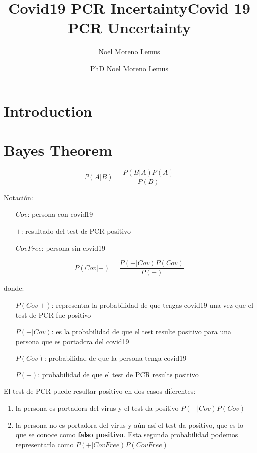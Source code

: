 \documentclass[10pt,a4paper]{article}
\author{Noel Moreno Lemus}
\title{Covid19 PCR Incertainty}
\begin{document}
\title{Covid 19 PCR Uncertainty}

\author{PhD Noel Moreno Lemus}

\maketitle

\section{Introduction}

\section{Bayes Theorem}

\begin{equation}
P(A|B) = \frac{P(B|A)P(A)}{P(B)}
\end{equation}

Notación:

\begin{itemize}
\item[$Cov$:] persona con covid19
\item[$+$:] resultado del test de PCR positivo
\item[$CovFree$:] persona sin covid19
\end{itemize}

\begin{equation}
P(Cov|+) = \frac{P(+|Cov)P(Cov)}{P(+)}
\end{equation}

donde:
\begin{itemize}
\item[$P(Cov|+)$:] representra la probabilidad de que tengas covid19 una vez que el test de PCR fue positivo
\item[$P(+|Cov)$:] es la probabilidad de que el test resulte positivo para una persona que es portadora del covid19
\item[$P(Cov)$:] probabilidad de que la persona tenga covid19
\item[$P(+)$:] probabilidad de que el test de PCR resulte positivo
\end{itemize}

El test de PCR puede resultar positivo en dos casos diferentes:
\begin{enumerate}
\item la persona es portadora del virus y el test da positivo $P(+|Cov)P(Cov)$
\item la persona no es portadora del virus y aún así el test da positivo, que es lo que se conoce como \textbf{falso positivo}. Esta segunda probabilidad podemos representarla como $P(+|CovFree)P(CovFree)$
\end{enumerate}
\end{document}
